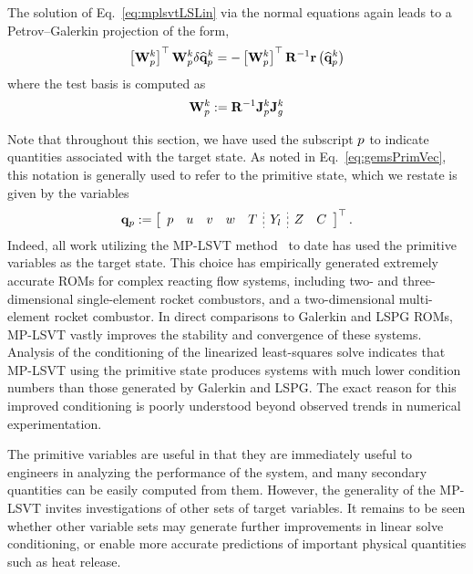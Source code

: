 The solution of Eq.~\ref{eq:mplsvtLSLin} via the normal equations again leads to a Petrov--Galerkin projection of the form,
%
\begin{equation}
    \left[\testBasisPrim^\newtonIdx\right]^\top \testBasisPrim^{\newtonIdx} \delta \primVecCoef^{\newtonIdx} = - \left[\testBasisPrim^{\newtonIdx}\right]^\top \resScaleInv \resFunc{\primVecCoef^{\newtonIdx}}
\end{equation}
%
where the test basis is computed as
%
\begin{equation}
    \testBasisPrim^{\newtonIdx} \defEq \resScaleInv \jacobPrim^{\newtonIdx} \jacobDecode^{\newtonIdx}
\end{equation}
%

Note that throughout this section, we have used the subscript $p$ to indicate quantities associated with the target state. As noted in Eq.~\ref{eq:gemsPrimVec}, this notation is generally used to refer to the primitive state, which we restate is given by the variables
%
\begin{equation}
    \primVec \defEq \left[
    \begin{array}{ccccc;{2pt/2pt}c;{2pt/2pt}cc}
    \pressure & \velX & \velY & \velZ & \temperature & \mfSpec & \mixFrac & \progVar
    \end{array}
    \right]^\top.
\end{equation}
%
Indeed, all work utilizing the MP-LSVT method~\cite{Huang2022,Wentland2021,Huang2022a} to date has used the primitive variables as the target state. This choice has empirically generated extremely accurate ROMs for complex reacting flow systems, including two- and three-dimensional single-element rocket combustors, and a two-dimensional multi-element rocket combustor. In direct comparisons to Galerkin and LSPG ROMs, MP-LSVT vastly improves the stability and convergence of these systems. Analysis of the conditioning of the linearized least-squares solve indicates that MP-LSVT using the primitive state produces systems with much lower condition numbers than those generated by Galerkin and LSPG. The exact reason for this improved conditioning is poorly understood beyond observed trends in numerical experimentation.

The primitive variables are useful in that they are immediately useful to engineers in analyzing the performance of the system, and many secondary quantities can be easily computed from them. However, the generality of the MP-LSVT invites investigations of other sets of target variables. It remains to be seen whether other variable sets may generate further improvements in linear solve conditioning, or enable more accurate predictions of important physical quantities such as heat release.
